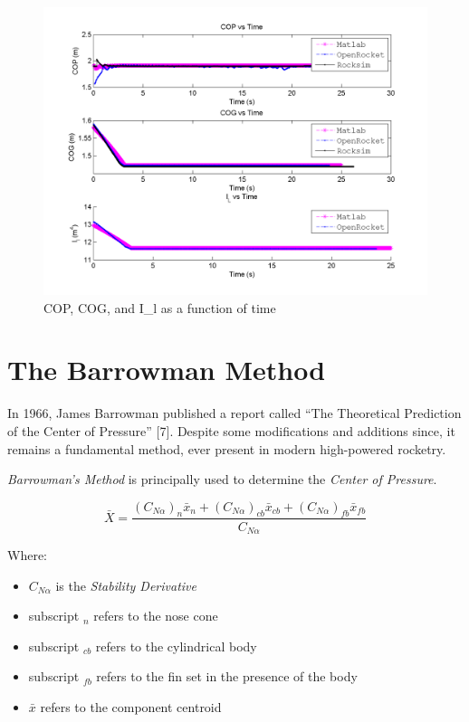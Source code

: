\documentclass[]{article}
\providecommand{\tightlist}{%
  \setlength{\itemsep}{0pt}\setlength{\parskip}{0pt}}
\begin{document}
\begin{figure}[htbp]
\centering
\includegraphics{images/plots/error_cog_cop_il_plot.png}
\caption{COP, COG, and I\_l as a function of time
\label{cop_cog_il_figure}}
\end{figure}

\clearpage

\section{The Barrowman Method}\label{the-barrowman-method}

In 1966, James Barrowman published a report called ``The Theoretical
Prediction of the Center of Pressure'' {[}7{]}. Despite some
modifications and additions since, it remains a fundamental method, ever
present in modern high-powered rocketry.

\emph{Barrowman's Method} is principally used to determine the
\emph{Center of Pressure}.

\begin{equation}
\label{rocket_center_of_pressure}
\bar{X} = 
\dfrac
{ \left( C_{N \alpha} \right)_n \bar{x}_n + \left( C_{N \alpha} \right)_{cb} \bar{x}_{cb} + \left( C_{N \alpha} \right)_{fb} \bar{x}_{fb} }
{ C_{N \alpha}  }
\end{equation}

Where:

\begin{itemize}
\tightlist
\item
  \(C_{N \alpha}\) is the \emph{Stability Derivative}
\item
  subscript \(_n\) refers to the nose cone
\item
  subscript \(_{cb}\) refers to the cylindrical body
\item
  subscript \(_{fb}\) refers to the fin set in the presence of the body
\item
  \(\bar{x}\) refers to the component centroid
\end{itemize}
\end{document}
